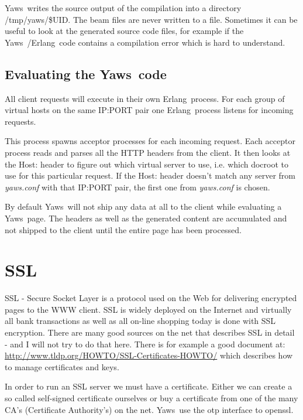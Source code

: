 \documentclass[11pt,oneside,english]{book}
\newcommand{\Erlang}            %
        {{\sc Erlang}}
\newcommand{\Yaws}            %
        {{\sc Yaws}}
\begin{document}
\Yaws\  writes the source output of the compilation into a directory
/tmp/yaws/\$UID. The beam files are never written to a file.
Sometimes it can be useful to look at the generated source code
files, for example if the \Yaws\ /\Erlang\  code contains a compilation
error which is hard to understand.


\section{Evaluating the \Yaws\  code}

All client requests will execute in their own \Erlang\  process.
For each group of virtual hosts on the same IP:PORT pair
one \Erlang\  process listens for incoming requests.

This process spawns acceptor processes for each incoming request.
Each acceptor process reads and parses all the HTTP headers from the
client. It then looks at the Host: header to figure out which
virtual server to use, i.e. which docroot to use for this
particular request. If the Host: header doesn't match
any server from \textit{yaws.conf} with that IP:PORT pair, the first
one from \textit{yaws.conf} is chosen.


By default \Yaws\  will not ship any data at all to the client
while evaluating a \Yaws\  page. The headers as well as the generated
content are accumulated and not shipped to the client until the
entire page has been processed.



\chapter{SSL}

SSL - Secure Socket Layer is a protocol used on the Web for
delivering encrypted pages to the WWW client. SSL is widely deployed
on the Internet and virtually all bank transactions as well as all
on-line shopping today is done with SSL encryption. There are many
good sources on the net that describes SSL in detail - and I will not
try to do that here.
There  is for example a good document at:
\url{http://www.tldp.org/HOWTO/SSL-Certificates-HOWTO/} which
describes how to manage certificates and keys.

In order to run an SSL server we must have a certificate. Either we
can create a so called self-signed certificate ourselves or buy a
certificate from one of the many CA's (Certificate Authority's) on the
net. \Yaws\  use the otp interface to openssl.
\end{document}
